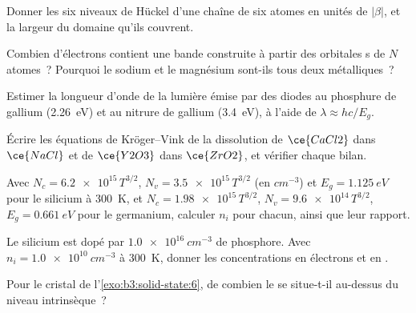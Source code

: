 \begin{exercise}[$\star$]\label{exo:b3:solid-state:1}
Donner les six niveaux de Hückel d'une chaîne de six atomes en unités de $|\beta|$, et la
largeur du domaine qu'ils couvrent.
\end{exercise}

\begin{exercise}[$\star$]\label{exo:b3:solid-state:2}
Combien d'électrons contient une bande construite à partir des orbitales s
de $N$ atomes~? Pourquoi le sodium et le magnésium sont-ils tous deux
métalliques~?
\end{exercise}

\begin{exercise}[$\star$]\label{exo:b3:solid-state:3}
Estimer la longueur d'onde de la lumière émise par des diodes au phosphure
de gallium (\qty{2.26}{eV}) et au nitrure de gallium (\qty{3.4}{eV}), à l'aide de $\lambda \approx hc/E_g$.
\end{exercise}

\begin{exercise}[$\star$]\label{exo:b3:solid-state:4}
Écrire les équations de Kröger--Vink de la dissolution de $\ce{CaCl2}$ dans $\ce{NaCl}$ et de $\ce{Y2O3}$ dans $\ce{ZrO2}$, et
vérifier chaque bilan.
\end{exercise}

\begin{exercise}[$\star\star$]\label{exo:b3:solid-state:5}
Avec $N_c = \num{6.2e15}\,T^{3/2}$, $N_v = \num{3.5e15}\,T^{3/2}$ (en $\unit{cm^{-3}}$) et $E_g = \qty{1.125}{eV}$ pour le silicium à \qty{300}{K},
et $N_c = \num{1.98e15}\,T^{3/2}$, $N_v = \num{9.6e14}\,T^{3/2}$, $E_g = \qty{0.661}{eV}$ pour le germanium, calculer $n_i$ pour chacun, ainsi que leur
rapport.
\end{exercise}

\begin{exercise}[$\star\star$]\label{exo:b3:solid-state:6}
Le silicium est dopé par $\qty{1.0e16}{cm^{-3}}$ de phosphore. Avec $n_i = \qty{1.0e10}{cm^{-3}}$ à \qty{300}{K}, donner les
concentrations en électrons et en .
\end{exercise}

\begin{exercise}[$\star\star$]\label{exo:b3:solid-state:7}
Pour le cristal de l'\cref{exo:b3:solid-state:6}, de combien le  se situe-t-il au-dessus du niveau intrinsèque~?
\end{exercise}

